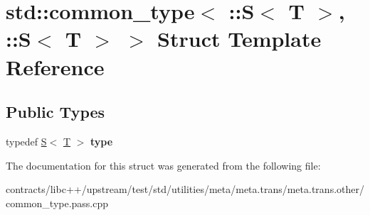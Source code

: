 \hypertarget{structstd_1_1common__type_3_01_1_1_s_3_01_t_01_4_00_01_1_1_s_3_01_t_01_4_01_4}{}\section{std\+:\+:common\+\_\+type$<$ \+:\+:S$<$ T $>$, \+:\+:S$<$ T $>$ $>$ Struct Template Reference}
\label{structstd_1_1common__type_3_01_1_1_s_3_01_t_01_4_00_01_1_1_s_3_01_t_01_4_01_4}
\subsection*{Public Types}
\begin{DoxyCompactItemize}
\item 
\mbox{\label{structstd_1_1common__type_3_01_1_1_s_3_01_t_01_4_00_01_1_1_s_3_01_t_01_4_01_4_a5aad3768422d0327d57be752fe2aca78}} 
typedef \mbox{\hyperlink{struct_s}{S}}$<$ \mbox{\hyperlink{struct_t}{T}} $>$ {\bfseries type}
\end{DoxyCompactItemize}


The documentation for this struct was generated from the following file\+:\begin{DoxyCompactItemize}
\item 
contracts/libc++/upstream/test/std/utilities/meta/meta.\+trans/meta.\+trans.\+other/common\+\_\+type.\+pass.\+cpp\end{DoxyCompactItemize}
